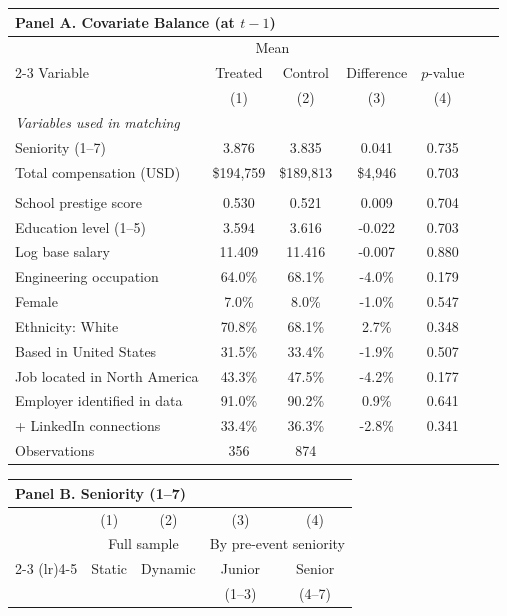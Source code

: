 \begin{center}
\begin{table}
\begin{tabular}{lcccccc}
\multicolumn{5}{l}{\textbf{Panel A. Covariate Balance (at $t-1$)}} \\[2pt]
\toprule
 & \multicolumn{2}{c}{Mean} & & & & \\
\cmidrule(lr){2-3}
Variable & Treated & Control & Difference  & $p$-value \\
 & (1) & (2) & (3) & (4) \\
\midrule
\multicolumn{7}{l}{\textit{Variables used in matching}} \\
\quad Seniority (1--7) & 3.876 & 3.835 & 0.041  & 0.735 \\
\quad Total compensation (USD) & \$194,759 & \$189,813 & \$4,946 &  0.703 \\
\addlinespace
\multicolumn{7}{l}{\textit{Variables not used in matching}} \\
\quad School prestige score & 0.530 & 0.521 & 0.009 &  0.704 \\
\quad Education level (1--5) & 3.594 & 3.616 & -0.022 &0.703 \\
\quad Log base salary & 11.409 & 11.416 & -0.007 & 0.880 \\
\quad Engineering occupation & 64.0\% & 68.1\% & -4.0\% &  0.179 \\
\quad Female & 7.0\% & 8.0\% & -1.0\% &  0.547 \\
\quad Ethnicity: White & 70.8\% & 68.1\% & 2.7\%  & 0.348 \\
\quad Based in United States & 31.5\% & 33.4\% & -1.9\% & 0.507 \\
\quad Job located in North America & 43.3\% & 47.5\% & -4.2\% &  0.177 \\
\quad Employer identified in data & 91.0\% & 90.2\% & 0.9\% & 0.641 \\
\quad 500+ LinkedIn connections & 33.4\% & 36.3\% & -2.8\% &  0.341 \\
\midrule
Observations & 356 & 874 & &  \\
\bottomrule
\end{tabular}
\vspace{10pt}
\begin{tabular}{lcccc}
\multicolumn{5}{l}{\textbf{Panel B. Seniority (1--7)}} \\[2pt]
\toprule
 & (1) & (2) & (3) & (4) \\
 & \multicolumn{2}{c}{Full sample} & \multicolumn{2}{c}{By pre-event seniority} \\
\cmidrule(lr){2-3} \cmidrule(lr){4-5}
 & Static & Dynamic & Junior & Senior \\
 & & & \small(1--3) & \small(4--7) \\

\end{tabular}
\end{table}
\end{center}
